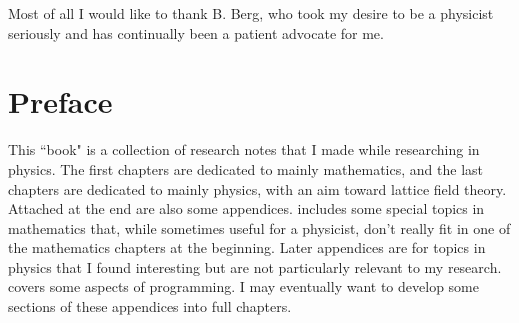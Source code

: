 \documentclass[12pt]{book}
\theoremstyle{definition}
\begin{document}
Most of all I would like to thank B. Berg, who took my desire to be a
physicist seriously and has continually been a patient advocate for me.

\chapter{Preface}
This ``book" is a collection of research notes that I made while researching in
physics. The first chapters are dedicated to mainly mathematics, and the last
chapters are dedicated to mainly physics, with an aim toward lattice field
theory. 
Attached at the end are also some appendices. 
 includes some special topics in mathematics 
that, while sometimes useful for a physicist, don't really fit in one of 
the mathematics chapters at the beginning.
Later appendices are for topics in physics that I found interesting but are
not particularly relevant to my research.
 covers some aspects of programming. 
I may eventually want
to develop some sections of these appendices into full chapters.


\tableofcontents                        %
\mainmatter                             %



%










\begin{appendices}



%


\end{appendices}


\printindex
\end{document}
